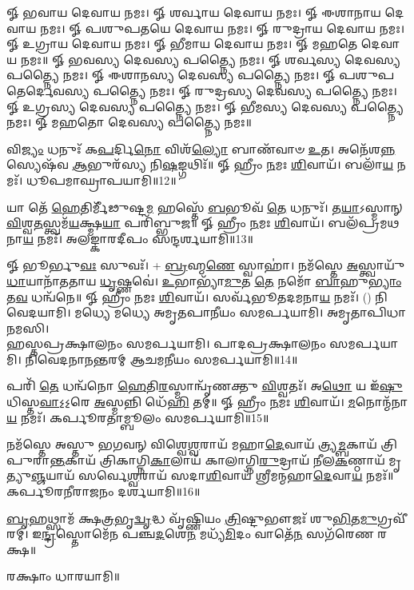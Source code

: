𑍐 𑌭𑌵𑌾𑌯 𑌦𑍇𑌵𑌾𑌯 𑌨𑌮𑌃। 𑍐 𑌶𑌰𑍍𑌵𑌾𑌯 𑌦𑍇𑌵𑌾𑌯 𑌨𑌮𑌃। 𑍐 𑌈𑌶𑌾𑌨𑌾𑌯 𑌦𑍇𑌵𑌾𑌯 𑌨𑌮𑌃। 𑍐 𑌪𑌶𑍁𑌪𑌤𑌯𑍇 𑌦𑍇𑌵𑌾𑌯 𑌨𑌮𑌃। 𑍐 𑌰𑍁𑌦𑍍𑌰𑌾𑌯 𑌦𑍇𑌵𑌾𑌯 𑌨𑌮𑌃। 𑍐 𑌉𑌗𑍍𑌰𑌾𑌯 𑌦𑍇𑌵𑌾𑌯 𑌨𑌮𑌃। 𑍐 𑌭𑍀𑌮𑌾𑌯 𑌦𑍇𑌵𑌾𑌯 𑌨𑌮𑌃। 𑍐 𑌮𑌹𑌤𑍇 𑌦𑍇𑌵𑌾𑌯 𑌨𑌮𑌃॥
𑍐 𑌭𑌵𑌸𑍍𑌯 𑌦𑍇𑌵𑌸𑍍𑌯 𑌪𑌤𑍍𑌨𑍍𑌯𑍈 𑌨𑌮𑌃। 𑍐 𑌶𑌰𑍍𑌵𑌸𑍍𑌯 𑌦𑍇𑌵𑌸𑍍𑌯 𑌪𑌤𑍍𑌨𑍍𑌯𑍈 𑌨𑌮𑌃। 𑍐 𑌈𑌶𑌾𑌨𑌸𑍍𑌯 𑌦𑍇𑌵𑌸𑍍𑌯 𑌪𑌤𑍍𑌨𑍍𑌯𑍈 𑌨𑌮𑌃। 𑍐 𑌪𑌶𑍁𑌪𑌤𑍇𑌰𑍍𑌦𑍇𑌵𑌸𑍍𑌯 𑌪𑌤𑍍𑌨𑍍𑌯𑍈 𑌨𑌮𑌃। 𑍐 𑌰𑍁𑌦𑍍𑌰𑌸𑍍𑌯 𑌦𑍇𑌵𑌸𑍍𑌯 𑌪𑌤𑍍𑌨𑍍𑌯𑍈 𑌨𑌮𑌃। 𑍐 𑌉𑌗𑍍𑌰𑌸𑍍𑌯 𑌦𑍇𑌵𑌸𑍍𑌯 𑌪𑌤𑍍𑌨𑍍𑌯𑍈 𑌨𑌮𑌃। 𑍐 𑌭𑍀𑌮𑌸𑍍𑌯 𑌦𑍇𑌵𑌸𑍍𑌯 𑌪𑌤𑍍𑌨𑍍𑌯𑍈 𑌨𑌮𑌃। 𑍐 𑌮𑌹𑌤𑍋 𑌦𑍇𑌵𑌸𑍍𑌯 𑌪𑌤𑍍𑌨𑍍𑌯𑍈 𑌨𑌮𑌃॥ 

𑌵𑌿\-\ul{𑌜𑍍𑌯𑌂} 𑌧𑌨𑍁𑌃᳴ 𑌕\-\ul{𑌪}\-𑌰𑍍𑌦𑌿\-\ul{𑌨𑍋} 𑌵𑌿𑌶᳴\-\ul{𑌲𑍍𑌯𑍋} 𑌬𑌾𑌣᳴𑌵𑌾𑍞 \ul{𑌉}\-𑌤। 𑌅𑌨𑍇᳴𑌶\-\ul{𑌨𑍍𑌨}\-\-𑌸𑍍𑌯𑍇𑌷᳴𑌵 \ul{𑌆}\-𑌭𑍁𑌰᳴𑌸𑍍𑌯 𑌨𑌿\-\ul{𑌷}\-𑌙𑍍𑌗𑌥𑌿𑌃᳴॥ 𑍐 𑌹𑍍𑌰𑍀𑌂 \ul{𑌨}\-𑌮𑌃 \ul{𑌶𑌿}\-𑌵𑌾𑌯᳴। 𑌬𑌲𑌾᳴\-\ul{𑌯} 𑌨𑌮𑌃᳴। 𑌧𑍂𑌪𑌮𑌾𑌘𑍍𑌰𑌾𑌪𑌯𑌾𑌮𑌿॥12॥

𑌯𑌾 𑌤𑍇᳴ \ul{𑌹𑍇}\-𑌤𑌿𑌰𑍍𑌮𑍀᳴𑌢𑍁𑌷𑍍𑌟\-\ul{𑌮} 𑌹𑌸𑍍𑌤𑍇᳴ \ul{𑌬}\-𑌭𑍂𑌵᳴ \ul{𑌤𑍇} 𑌧𑌨𑍁𑌃᳴। 𑌤\-\ul{𑌯𑌾}\-𑌽𑌸𑍍𑌮𑌾𑌨𑍍 \ul{𑌵𑌿}\-𑌶𑍍𑌵\-\ul{𑌤}\-𑌸𑍍𑌤𑍍𑌵𑌮᳴\-\ul{𑌯}\-𑌕𑍍𑌷𑍍𑌮\-\ul{𑌯𑌾} 𑌪𑌰𑌿᳴𑌬𑍍𑌭𑍁𑌜॥ 𑍐 𑌹𑍍𑌰𑍀𑌂 \ul{𑌨}\-𑌮𑌃 \ul{𑌶𑌿}\-𑌵𑌾𑌯᳴। 𑌬𑌲᳴𑌪𑍍𑌰𑌮𑌥𑌨𑌾\-\ul{𑌯} 𑌨𑌮𑌃᳴। 𑌅𑌲𑌙𑍍𑌕𑌾𑌰𑌦𑍀𑌪𑌂 𑌸𑌨𑍍𑌦𑌰𑍍𑌶𑌯𑌾𑌮𑌿॥13॥

𑍐 𑌭𑍂𑌰𑍍𑌭𑍁\-\ul{𑌵𑌃} 𑌸𑍁𑌵𑌃᳴। + \ul{𑌬𑍍𑌰}\-𑌹𑍍𑌮\-\ul{𑌣𑍇} 𑌸𑍍𑌵𑌾𑌹𑌾॑। 𑌨𑌮᳴𑌸𑍍𑌤𑍇 \ul{𑌅}\-𑌸𑍍𑌤𑍍𑌵𑌾𑌯𑍁᳴\-\ul{𑌧𑌾}\-𑌯𑌾𑌨𑌾᳴𑌤𑌤𑌾𑌯 \ul{𑌧𑍃}\-𑌷𑍍𑌣𑌵𑍇॑। \ul{𑌉}\-𑌭𑌾𑌭𑍍𑌯𑌾᳴\-\ul{𑌮𑍁}\-𑌤 \ul{𑌤𑍇} 𑌨𑌮𑍋᳴ \ul{𑌬𑌾}\-𑌹𑍁\-\ul{𑌭𑍍𑌯𑌾𑌂} 𑌤\-\ul{𑌵} 𑌧𑌨𑍍𑌵᳴𑌨𑍇॥ 𑍐 𑌹𑍍𑌰𑍀𑌂 \ul{𑌨}\-𑌮𑌃 \ul{𑌶𑌿}\-𑌵𑌾𑌯᳴। 𑌸𑌰𑍍𑌵᳴𑌭𑍂𑌤𑌦𑌮𑌨𑌾\-\ul{𑌯} 𑌨𑌮𑌃᳴। () 𑌨𑌿𑌵𑍇𑌦𑌯𑌾𑌮𑌿। 𑌮𑌧𑍍𑌯𑍇 𑌮𑌧𑍍𑌯𑍇 𑌅𑌮𑍃𑌤𑌪𑌾𑌨𑍀𑌯𑌂 𑌸𑌮𑌰𑍍𑌪𑌯𑌾𑌮𑌿। 𑌅𑌮𑍃𑌤𑌾𑌪𑌿𑌧𑌾𑌨𑌮𑌸𑌿।\\
𑌹𑌸𑍍𑌤𑌪𑍍𑌰𑌕𑍍𑌷𑌾𑌲𑌨𑌂 𑌸𑌮𑌰𑍍𑌪𑌯𑌾𑌮𑌿। 𑌪𑌾𑌦𑌪𑍍𑌰𑌕𑍍𑌷𑌾𑌲𑌨𑌂 𑌸𑌮𑌰𑍍𑌪𑌯𑌾𑌮𑌿। 𑌨𑌿𑌵𑍇𑌦𑌨𑌾𑌨𑌨𑍍𑌤𑌰𑌮𑍍 𑌆𑌚𑌮𑌨𑍀𑌯𑌂 𑌸𑌮𑌰𑍍𑌪𑌯𑌾𑌮𑌿॥14॥

𑌪𑌰𑌿᳴ \ul{𑌤𑍇} 𑌧𑌨𑍍𑌵᳴𑌨𑍋 \ul{𑌹𑍇}\-𑌤𑌿\-\ul{𑌰}\-𑌸𑍍𑌮𑌾𑌨𑍍𑌵𑍃᳴𑌣𑌕𑍍𑌤𑍁 \ul{𑌵𑌿}\-𑌶𑍍𑌵𑌤𑌃᳴। 𑌅\-\ul{𑌥𑍋} 𑌯 𑌇᳴\-\ul{𑌷𑍁}\-𑌧𑌿𑌸𑍍𑌤\-\ul{𑌵𑌾}\-𑌽॒𑌽॒𑌰𑍇 \ul{𑌅}\-𑌸𑍍𑌮𑌨𑍍𑌨𑌿 𑌧𑍇᳴\-\ul{𑌹𑌿} 𑌤𑌮𑍍॥ 𑍐 𑌹𑍍𑌰𑍀𑌂 \ul{𑌨}\-𑌮𑌃 \ul{𑌶𑌿}\-𑌵𑌾𑌯᳴। \ul{𑌮}\-𑌨𑍋𑌨𑍍𑌮᳴𑌨𑌾\-\ul{𑌯} 𑌨𑌮𑌃᳴। 𑌕𑌰𑍍𑌪𑍂𑌰𑌤𑌾𑌮𑍍𑌬𑍂𑌲𑌂 𑌸𑌮𑌰𑍍𑌪𑌯𑌾𑌮𑌿॥15॥

𑌨𑌮᳴𑌸𑍍𑌤𑍇 𑌅𑌸𑍍𑌤𑍁 𑌭𑌗𑌵𑌨𑍍 𑌵𑌿𑌶𑍍𑌵𑍇\-\ul{𑌶𑍍𑌵}\-𑌰𑌾𑌯᳴ 𑌮𑌹𑌾\-\ul{𑌦𑍇}\-𑌵𑌾𑌯᳴ 𑌤𑍍𑌰𑍍𑌯\-\ul{𑌮𑍍𑌬}\-𑌕𑌾𑌯᳴ 𑌤𑍍𑌰𑌿𑌪𑍁𑌰𑌾\-\ul{𑌨𑍍𑌤}\-𑌕𑌾𑌯᳴ 𑌤𑍍𑌰𑌿𑌕𑌾𑌗𑍍𑌨𑌿\-\ul{𑌕𑌾}\-𑌲𑌾𑌯᳴ 𑌕𑌾𑌲𑌾𑌗𑍍𑌨𑌿\-\ul{𑌰𑍁}\-𑌦𑍍𑌰𑌾𑌯᳴ 𑌨𑍀𑌲\-\ul{𑌕}\-𑌣𑍍𑌠𑌾𑌯᳴ 𑌮𑍃𑌤𑍍𑌯𑍁\-\ul{𑌞𑍍𑌜}\-𑌯𑌾𑌯᳴ 𑌸𑌰𑍍𑌵𑍇\-\ul{𑌶𑍍𑌵}\-𑌰𑌾𑌯᳴ 𑌸𑌦𑌾\-\ul{𑌶𑌿}\-𑌵𑌾𑌯᳴ 𑌶𑍍𑌰𑍀𑌮𑌨𑍍𑌮𑌹𑌾\-\ul{𑌦𑍇}\-𑌵𑌾\-\ul{𑌯} 𑌨𑌮𑌃᳴॥ 𑌕𑌰𑍍𑌪𑍂𑌰𑌨𑍀𑌰𑌾𑌜𑌨𑌂 𑌦𑌰𑍍𑌶𑌯𑌾𑌮𑌿॥16॥

\-\ul{𑌬𑍃}\-𑌹𑌥𑍍𑌸𑌾𑌮᳴ 𑌕𑍍𑌷\-\ul{𑌤𑍍𑌰}\-𑌭𑍃\-\ul{𑌦𑍍𑌵𑍃}\-𑌦𑍍𑌧 𑌵𑍃᳴𑌷𑍍𑌣𑌿𑌯𑌂 \ul{𑌤𑍍𑌰𑌿}\-𑌷𑍍𑌟𑍁𑌭𑍗𑌜𑌃᳴ 𑌶𑍁\-\ul{𑌭𑌿}\-𑌤\-\ul{𑌮𑍁}\-𑌗𑍍𑌰𑌵𑍀᳴𑌰𑌮𑍍।
𑌇\-\ul{𑌨𑍍𑌦𑍍𑌰}\-𑌸𑍍𑌤𑍋𑌮𑍇᳴𑌨 𑌪𑌞𑍍𑌚\-\ul{𑌦}\-𑌶𑍇\-\ul{𑌨} 𑌮𑌧𑍍𑌯᳴\-\ul{𑌮𑌿}\-𑌦𑌂 𑌵𑌾𑌤𑍇᳴\-\ul{𑌨} 𑌸𑌗᳴𑌰𑍇𑌣 𑌰𑌕𑍍𑌷॥

𑌰𑌕𑍍𑌷𑌾𑌂 𑌧𑌾𑌰𑌯𑌾𑌮𑌿॥


{\small \closesection}


